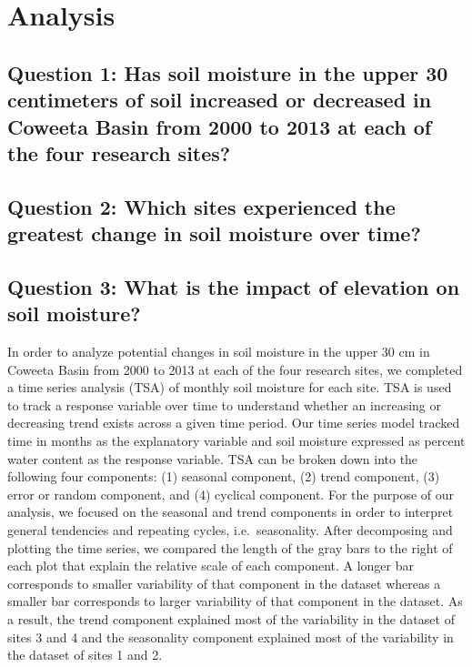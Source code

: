 \documentclass[
  12pt,
]{article}
\begin{document}
\newpage

\hypertarget{analysis}{%
\section{Analysis}\label{analysis}}

\hypertarget{question-1-has-soil-moisture-in-the-upper-30-centimeters-of-soil-increased-or-decreased-in-coweeta-basin-from-2000-to-2013-at-each-of-the-four-research-sites}{%
\subsection{Question 1: Has soil moisture in the upper 30 centimeters of
soil increased or decreased in Coweeta Basin from 2000 to 2013 at each
of the four research
sites?}\label{question-1-has-soil-moisture-in-the-upper-30-centimeters-of-soil-increased-or-decreased-in-coweeta-basin-from-2000-to-2013-at-each-of-the-four-research-sites}}

\hypertarget{question-2-which-sites-experienced-the-greatest-change-in-soil-moisture-over-time}{%
\subsection{Question 2: Which sites experienced the greatest change in
soil moisture over
time?}\label{question-2-which-sites-experienced-the-greatest-change-in-soil-moisture-over-time}}

\hypertarget{question-3-what-is-the-impact-of-elevation-on-soil-moisture}{%
\subsection{Question 3: What is the impact of elevation on soil
moisture?}\label{question-3-what-is-the-impact-of-elevation-on-soil-moisture}}

In order to analyze potential changes in soil moisture in the upper 30
cm in Coweeta Basin from 2000 to 2013 at each of the four research
sites, we completed a time series analysis (TSA) of monthly soil
moisture for each site. TSA is used to track a response variable over
time to understand whether an increasing or decreasing trend exists
across a given time period. Our time series model tracked time in months
as the explanatory variable and soil moisture expressed as percent water
content as the response variable. TSA can be broken down into the
following four components: (1) seasonal component, (2) trend component,
(3) error or random component, and (4) cyclical component. For the
purpose of our analysis, we focused on the seasonal and trend components
in order to interpret general tendencies and repeating cycles,
i.e.~seasonality. After decomposing and plotting the time series, we
compared the length of the gray bars to the right of each plot that
explain the relative scale of each component. A longer bar corresponds
to smaller variability of that component in the dataset whereas a
smaller bar corresponds to larger variability of that component in the
dataset. As a result, the trend component explained most of the
variability in the dataset of sites 3 and 4 and the seasonality
component explained most of the variability in the dataset of sites 1
and 2.
\end{document}
